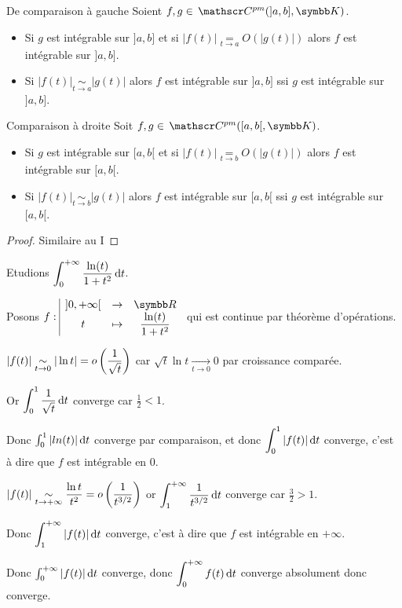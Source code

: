 \begin{theoreme}{De comparaison à gauche}{}
    Soient $f, g \in \mc {pm}(]a, b], \K)$. 
    
    \begin{itemize}
        \item Si $g$ est intégrable sur $]a, b]$ et si $|f(t)| \underset{t \to a   }{= } O(|g(t)|)$
    alors $f$ est intégrable sur $]a, b]$.
        \item Si $|f(t)| \underset{t \to a   }{\sim } |g(t)|$ alors $f$ est intégrable sur $]a, b]$ ssi $g$ est intégrable sur $]a, b]$.
    \end{itemize}
\end{theoreme}

\begin{theoreme}{Comparaison à droite}{}
    Soit $f, g \in \mc{pm}([a, b[, \K)$. 
    
    \begin{itemize}
        \item Si $g$ est intégrable sur $[a, b[$ et si $|f(t)| \underset{t \to b   }{= } O(|g(t)|)$
    alors $f$ est intégrable sur $[a, b[$.
        \item Si $|f(t)| \underset{t \to b   }{\sim } |g(t)|$ alors $f$ est intégrable sur $[a, b[$ ssi $g$ est intégrable sur $[a, b[$.
    \end{itemize}
\end{theoreme}

\begin{proof}
    Similaire au I
\end{proof}

\begin{exemple}
    Etudions $\displaystyle \int_{0}^{+ \infty   } \frac{\ln (t)}{1 + t^2} \,\mathrm{d}t$. 

    Posons $\fonction f {]0, + \infty[}{\R}{t}{\frac{\ln (t)}{1 + t^2}}$ qui est continue par théorème d'opérations.


    \svspace $\displaystyle |f(t)| \underset{t \to 0   }{\sim } |\ln t| = o \left( \frac 1 {\sqrt t} \right)$
    car $\sqrt t \ln t \xrightarrow[t \to 0 ]{} 0$ par croissance comparée. 

    Or $\displaystyle \int_{0}^{1 } \frac 1 {\sqrt t} \,\mathrm{d}t$ converge car $\frac 1 2 < 1$. 

    Donc $\int_0^1 |ln(t) | \,\mathrm{d}t$ converge par comparaison, et donc 
    $\displaystyle \int_{0}^{1 } |f(t)| \,\mathrm{d}t$ converge, c'est à dire que $f$ est intégrable en $0$.


    \svspace $\displaystyle |f(t)| \underset{t \to + \infty   }{\sim } \frac{\ln t}{t^2} = o \left( \frac 1 {t^{3/2}} \right)$
    or $\displaystyle \int_{1 }^{+ \infty   } \frac 1 {t^{3/2}} \,\mathrm{d}t$ converge car $\frac 3 2 > 1$.

    Donc $\displaystyle \int_{1 }^{+ \infty   } |f(t)| \,\mathrm{d}t$ converge, c'est à dire que $f$ est intégrable en $+ \infty$.

    Donc $\int_0^{+ \infty} | f(t) | \,\mathrm{d}t$ converge, donc $\displaystyle \int_{0}^{+ \infty   } f(t) \,\mathrm{d}t$ converge absolument donc converge.
\end{exemple}


